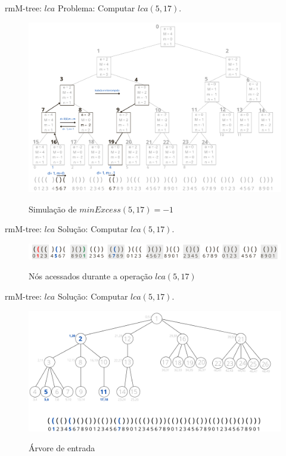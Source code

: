 \begin{frame}{rmM-tree: $lca$}
    Problema: Computar $lca(5,17)$.
     \begin{figure}[h!]
         \centering
         \includegraphics[scale=0.27]{images/rmm-tree-bin-minexcess.png}\\
         \caption{Simulação de $minExcess(5,17)=-1$}
     \end{figure} 
 \end{frame}



 \begin{frame}{rmM-tree: $lca$}
    Solução: Computar $lca(5,17)$.
     \begin{figure}[h!]
         \centering
         \includegraphics[scale=0.8]{images/lca-resposta.png}\\
         \caption{Nós acessados durante a operação $lca(5,17)$}
     \end{figure} 
 \end{frame}

 \begin{frame}{rmM-tree: $lca$}
    Solução: Computar $lca(5,17)$.
     \begin{figure}[h!]
         \centering
         \includegraphics[scale=0.40]{images/lca-res.png}\\
         \caption{Árvore de entrada}
     \end{figure} 
 \end{frame}